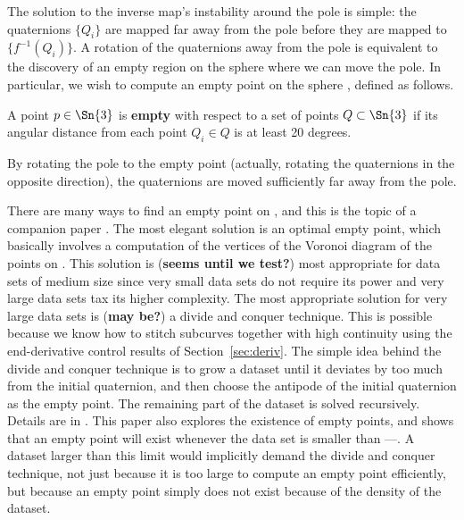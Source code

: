\documentclass[12pt]{article}
\begin{document}


The solution to the inverse map's instability around the pole
is simple: the quaternions $\{Q_i\}$ are mapped far away from the pole
before they are mapped to $\{f^{-1}(Q_i)\}$.
%
%
A rotation of the quaternions away from the pole 
is equivalent to the discovery of an empty region on the sphere 
where we can move the pole.
In particular, we wish to compute an empty point on the sphere , defined as follows.
%
\begin{defn2}
A point $p \in \Sn{3}$ is {\bf empty} with respect to a set of points $Q \subset \Sn{3}$
if its angular distance from each point $Q_i \in Q$ is at least 20 degrees.
\end{defn2}
%
By rotating the pole to the empty point
(actually, rotating the quaternions in the opposite direction),
the quaternions are moved sufficiently far away from the pole.

There are many ways to find an empty point on ,
and this is the topic of a companion paper \cite{jjempty05}.
The most elegant solution is an optimal empty point, which basically involves
a computation of the vertices of the Voronoi diagram of the points on .
This solution is ({\bf seems until we test?}) most appropriate for data sets 
of medium size since very small data sets do not require its power and
very large data sets tax its higher complexity.
The most appropriate solution for very large data sets is ({\bf may be?})
a divide and conquer technique.
This is possible because we know how to stitch subcurves together with high
continuity using the end-derivative control results of Section~\ref{sec:deriv}.
The simple idea behind the divide and conquer technique is to grow a dataset until
it deviates by too much from the initial quaternion, and then choose the antipode
of the initial quaternion as the empty point.
The remaining part of the dataset is solved recursively.
Details are in \cite{jjempty05}.
This paper also explores the existence of empty points,
and shows that an empty point will exist whenever the data set is smaller
than ---.
A dataset larger than this limit would implicitly 
demand the divide and conquer technique, not just because it is too large to
compute an empty point efficiently, but because an empty point simply does not exist
because of the density of the dataset.
\end{document}
